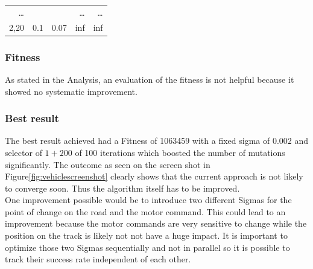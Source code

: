\documentclass{scrartcl}
\begin{document}
\begin{table}[H]
\begin{tabular}{r r r|r r }
\dots & & & \dots & \dots \\
2,20 & 0.1 & 0.07 & inf & inf \\ 
\end{tabular}
\label{tab:vehicle}
\end{table}


\subsubsection{Fitness}
As stated in the Analysis, an evaluation of the fitness is not helpful because it showed no systematic improvement.

\subsubsection{Best result}
The best result achieved had a Fitness of 1063459 with a fixed sigma of 0.002 and selector of $1+200$ of 100 iterations which boosted the number of mutations significantly. The outcome as seen on the screen shot in Figure\ref{fig:vehiclescreenshot} clearly shows that the current approach is not likely to converge soon. Thus the algorithm itself has to be improved.\\
One improvement possible would be to introduce two different Sigmas for the point of change on the road and the motor command. This could lead to an improvement because the motor commands are very sensitive to change while the position on the track is likely not not have a huge impact. It is important to optimize those two Sigmas sequentially and not in parallel so it is possible to track their success rate independent of each other.
\end{document}

